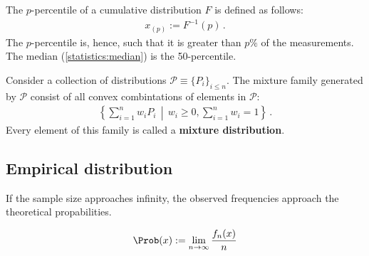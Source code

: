     \begin{definition}[Percentile]
        The $p$-percentile of a cumulative distribution $F$ is defined as follows:
        \begin{gather}
            x_{(p)} := F^{-1}(p)\,.
        \end{gather}
        The $p$-percentile is, hence, such that it is greater than $p\%$ of the measurements. The median (\cref{statistics:median}) is the 50-percentile.
    \end{definition}


    \begin{example}
        Consider a collection of distributions $\mathcal{P}\equiv\{P_i\}_{i\leq n}$. The mixture family generated by $\mathcal{P}$ consist of all convex combintations of elements in $\mathcal{P}$:
        \begin{gather}
            \left\{\sum_{i=1}^nw_iP_i\,\middle\vert\,w_i\geq0,\sum_{i=1}^nw_i = 1\right\}\,.
        \end{gather}
        Every element of this family is called a \textbf{mixture distribution}.
    \end{example}

\subsection{Empirical distribution}


    \begin{theorem}\label{statistics:large_numbers}
        If the sample size approaches infinity, the observed frequencies approach the theoretical propabilities.
    \end{theorem}
    \begin{result}
        \begin{gather}
            \label{statistics:frequentist_probability}
            \Prob(x) := \lim_{n\rightarrow\infty}\frac{f_n(x)}{n}
        \end{gather}
    \end{result}

